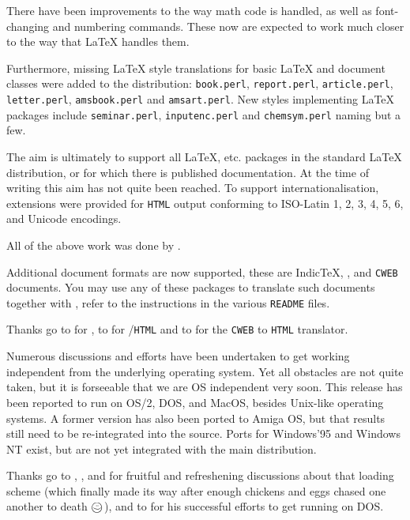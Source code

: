 \smallskip\noindent
There have been improvements to the way math code is handled, as well
as font-changing and numbering commands. These now are expected to
work much closer to the way that \LaTeX{} handles them.

\smallskip\noindent
Furthermore, missing \LaTeX{} style translations for basic \LaTeX{}
and \AmSTeX{} document classes were added to the distribution:
\texttt{book.perl}, \texttt{report.perl}, \texttt{article.perl},
\texttt{letter.perl}, \texttt{amsbook.perl} and \texttt{amsart.perl}.
New styles implementing \LaTeX{} packages include \texttt{seminar.perl},
\texttt{inputenc.perl} and \texttt{chemsym.perl} naming but a few.

The aim is ultimately to support all \LaTeX{}, \AmSTeX{} etc. packages in the
standard \LaTeX{} distribution, or for which there is published documentation.
At the time of writing this aim has not quite been reached.
To support internationalisation, \Perl{} extensions were provided for
\texttt{HTML} output conforming to ISO-Latin 1, 2, 3, 4, 5, 6,
and Unicode encodings.

\smallskip\noindent
All of the above work was done by \RossMoore.
\bigskip

Additional document formats are now supported, these are Indic\TeX{},
\FoilTeX{}, and \texttt{CWEB} documents.
You may use any of these packages to translate such documents together
with \latextohtml{}, refer to the instructions in the various
\texttt{README} files.

\smallskip\noindent
Thanks go to \RossMoore{} for \IndicHTML{}, to \Veytsman{} for
\FoilTeX{}/\texttt{HTML} and to \Lippmann{} for the \texttt{CWEB} to
\texttt{HTML} translator.

\bigskip
Numerous discussions and efforts have been undertaken to get
\latextohtml{} working independent from the underlying operating
system.
Yet all obstacles are not quite taken, but it is forseeable that we are
OS independent very soon.
This release has been reported to run on OS/2, DOS, and MacOS, besides
Unix-like operating systems.
A former version has also been ported to Amiga OS, but that results
still need to be re-integrated into the source.
Ports for Windows'95 and Windows NT exist, but are not yet
integrated with the main distribution.

\smallskip\noindent
Thanks go to \Hennecke, \AxelRamge, \Rouchal{} and \Wortmann{} for
fruitful and refreshening discussions about that 
loading scheme (which finally made its way after enough chickens and
eggs chased one another to death \mbox{$\mathsmiley$}\,),
and to \Taupin{} for his successful efforts to get \latextohtml{}
running on DOS.

